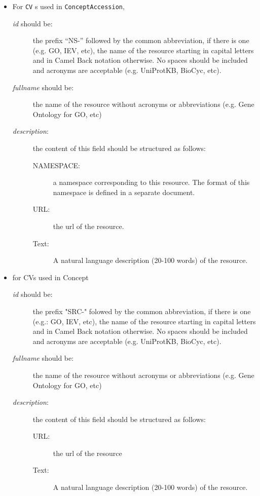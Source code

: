 \documentclass[a4paper,10pt]{article}
\newcommand{\field}[1]{\textit{#1}\xspace}
\newcommand{\term}[1]{\texttt{#1}\xspace}
\begin{document}
\begin{itemize}
\item For \term{CV}s used in \term{ConceptAccession}, 
  
  \begin{description}
  \item[\field{id} should be:] the prefix ``NS-'' followed by the common
    abbreviation, if there is one (e.g. GO, IEV, etc), the name of the
    resource starting in capital letters and in Camel Back notation
    otherwise. No spaces should be included and acronyms are acceptable
    (e.g. UniProtKB, BioCyc, etc).
  \item[\field{fullname} should be:] the name of the resource without
    acronyms or abbreviations (e.g. Gene Ontology for GO, etc)
  \item[\field{description}:] the content of this field should be structured
    as follows: 
    \begin{description}
    \item[NAMESPACE:] a namespace corresponding to this resource. The format
      of this namespace is defined in a separate document. 
    \item[URL:] the url of the resource. 
    \item[Text:] A natural language description (20-100 words) of the
      resource.
    \end{description}
  \end{description}

\item for CVs used in Concept
  \begin{description}
  \item[\field{id} should be:] the prefix "SRC-" folowed by the common
    abbreviation, if there is one (e.g.: GO, IEV, etc), the name of the
    resource starting in capital letters and in Camel Back notation
    otherwise. No spaces should be included and acronyms are acceptable
    (e.g. UniProtKB, BioCyc, etc).
  \item[\field{fullname} should be:] the name of the resource without
    acronyms or abbreviations (e.g. Gene Ontology for GO, etc)
  \item[\field{description}:] the content of this field should be structured as follows: 
    \begin{description}
    \item[URL:] the url of the resource 
    \item[Text:] A natural language description (20-100 words) of the resource.
    \end{description}
  \end{description}
\end{itemize}
\end{document}
